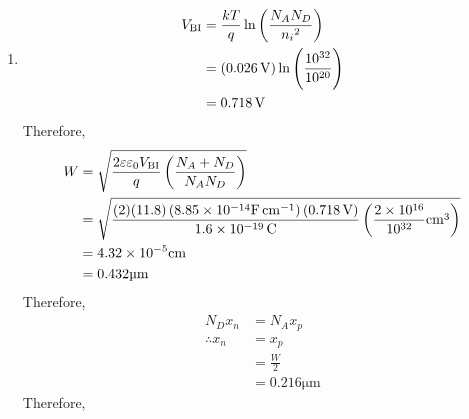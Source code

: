 \documentclass[titlepage, fleqn, a4paper, 12pt, twoside]{article}
\theoremstyle{definition}
\theoremstyle{theorem}
\begin{document}
\begin{solution}
	\begin{enumerate}[leftmargin=*]
		\item
			\begin{align*}
				V_{\text{BI}} & = \frac{k T}{q} \ln\left( \frac{N_A N_D}{{n_i}^2} \right)              \\
                                              & = \left( 0.026 \volt \right) \ln\left( \frac{10^{32}}{10^{20}} \right) \\
                                              & = 0.718 \volt
			\end{align*}
			Therefore,
			\begin{align*}
				W & = \sqrt{\frac{2 \varepsilon \varepsilon_0 V_{\text{BI}}}{q} \left( \frac{N_A + N_D}{N_A N_D} \right)}                                                                                                          \\
                                  & = \sqrt{\frac{(2) (11.8) \left( 8.85 \times 10^{-14} \si{\farad\per\centi\metre} \right) (0.718 \volt)}{1.6 \times 10^{-19} \coulomb} \left( \frac{2 \times 10^{16}}{10^{32}} \si{\centi\metre\cubed} \right)} \\
                                  & = 4.32 \times 10^{-5} \si{\centi\metre}                                                                                                                                                                        \\
                                  & = 0.432 \si{\micro\metre}
			\end{align*}
			Therefore,
			\begin{align*}
				N_D x_n        & = N_A x_p     \\
				\therefore x_n & = x_p         \\
                                               & = \frac{W}{2} \\
                                               & = 0.216 \si{\micro\metre}
			\end{align*}
			Therefore,
			\begin{figure}[H]
				\centering
\end{figure}
\end{enumerate}
\end{solution}
\end{document}
